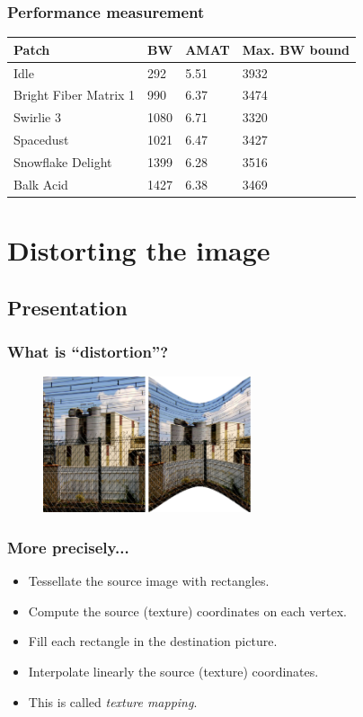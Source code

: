 \documentclass{beamer}
\begin{document}
\frame
{
  \frametitle{Performance measurement}

  \begin{tabular}{|l|l|l|l|}
  \hline
  \textbf{Patch} & \textbf{BW} & \textbf{AMAT} & \textbf{Max. BW bound} \\
  \hline
  Idle & 292 & 5.51 & 3932 \\
  \hline
  Bright Fiber Matrix 1 & 990 & 6.37 & 3474 \\
  \hline
  Swirlie 3 & 1080 & 6.71 & 3320 \\
  \hline
  Spacedust & 1021 & 6.47 & 3427 \\
  \hline
  Snowflake Delight & 1399 & 6.28 & 3516 \\
  \hline
  Balk Acid & 1427 & 6.38 & 3469 \\
  \hline
  \end{tabular}
}


\section{Distorting the image}
\subsection{Presentation}
\frame
{
  \frametitle{What is ``distortion''?}

  \begin{figure}[H]
  \includegraphics[height=40mm]{distortionsanofi.eps}
  \end{figure}
}

\frame
{
  \frametitle{More precisely...}
  \begin{itemize}
  \item Tessellate the source image with rectangles.
  \item Compute the source (texture) coordinates on each vertex.
  \item Fill each rectangle in the destination picture.
  \item Interpolate linearly the source (texture) coordinates.
  \item This is called \textit{texture mapping}.
  \end{itemize}
}
\end{document}
